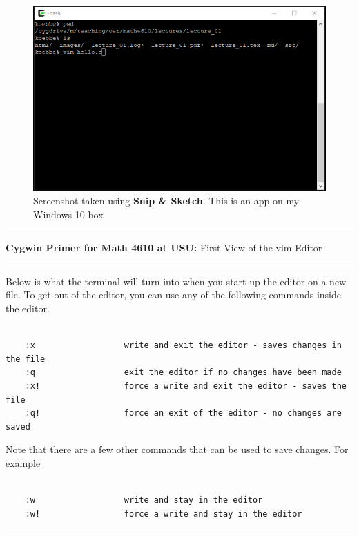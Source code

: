 \documentclass[10pt,fleqn]{article}
\begin{document}
\begin{figure}[h]
\centering
\includegraphics{../images/cygwin_05.png}
\caption{{Screenshot} taken using {\bf Snip \& Sketch}. This is an app on
         my Windows 10 box}
\end{figure}
\eject
\vskip0.1in\hrule\vskip0.1in
\noindent
{{\bf Cygwin Primer for Math 4610 at USU:} First View of the vim Editor} 
\vskip0.1in\hrule\vskip0.1in
\noindent
Below is what the terminal will turn into when you start up the editor on a new
file. To get out of the editor, you can use any of the following commands inside
the editor.
\begin{verbatim}

    :x                  write and exit the editor - saves changes in the file
    :q                  exit the editor if no changes have been made
    :x!                 force a write and exit the editor - saves the file
    :q!                 force an exit of the editor - no changes are saved

\end{verbatim}
Note that there are a few other commands that can be used to save changes. For
example
\begin{verbatim}

    :w                  write and stay in the editor
    :w!                 force a write and stay in the editor

\end{verbatim}
\vskip0.1in\hrule\vskip0.1in
\vfill
\end{document}
